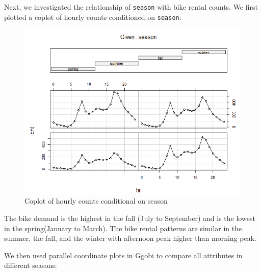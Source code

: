 \documentclass[12pt]{article}
\begin{document}
	Next, we investigated the relationship of \texttt{season} with bike rental counts. We first plotted a coplot of hourly counts conditioned on \texttt{season}:
	
		\begin{figure}[H]
			\centering
			\includegraphics[width=\linewidth]{figures/coplot_season.png}
			\caption{Coplot of hourly counts conditional on season}
		\end{figure}
	
	 The bike demand is the highest in the fall (July to September) and is the lowest in the spring(January to March). The bike rental patterns are similar in the summer, the fall, and the winter with afternoon peak higher than morning peak. 
	 
	 We then used parallel coordinate plots in Ggobi to compare all attributes in different seasons:
	 
\end{document}

